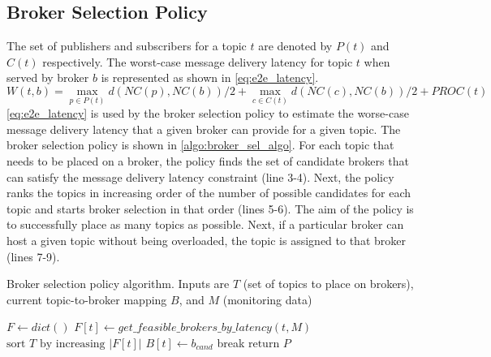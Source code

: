 \subsection{Broker Selection Policy}
The set of publishers and subscribers for a topic $t$ are denoted by $P \left( t \right)$ and $C \left( t \right)$ respectively. The worst-case message delivery latency for topic $t$ when served by broker $b$ is represented as shown in \cref{eq:e2e_latency}.
\begin{equation}
W\left( t, b \right) = \max\limits_{p \in P\left( t \right)} d \left( NC \left( p\right), NC \left( b\right) \right)/2 + \max\limits_{c \in C\left( t \right)} d \left( NC \left( c\right), NC \left( b\right)\right)/2 + PROC \left( t \right)
\label{eq:e2e_latency}
\end{equation}
\cref{eq:e2e_latency} is used by the broker selection policy to estimate the worse-case message delivery latency that a given broker can provide for a given topic. The broker selection policy is shown in \cref{algo:broker_sel_algo}. For each topic that needs to be placed on a broker, the policy finds the set of candidate brokers that can satisfy the message delivery latency constraint (line 3-4). Next, the policy ranks the topics in increasing order of the number of possible candidates for each topic and starts broker selection in that order (lines 5-6). The aim of the policy is to successfully place as many topics as possible. Next, if a particular broker can host a given topic without being overloaded, the topic is assigned to that broker (lines 7-9). 
\begin{algorithm}
\caption{Broker selection policy algorithm. Inputs are $T$ (set of topics to place on brokers), current topic-to-broker mapping $B$, and $M$ (monitoring data)}\label{algo:broker_sel_algo}
\begin{algorithmic}[1]
\State $F \gets dict\left(\right)$
    \State $F \left[ t \right] \gets get\_feasible\_brokers\_by\_latency \left( t , M\right)$
\EndFor
\State $\text{sort } T \text{ by increasing } |F \left[ t \right]|$
         
            \State $B \left[ t \right] \gets b_{cand}$
            \State break
        \EndIf
    \EndFor
\EndFor
\State $\text{return } P$
\EndProcedure
\end{algorithmic}
\end{algorithm}

